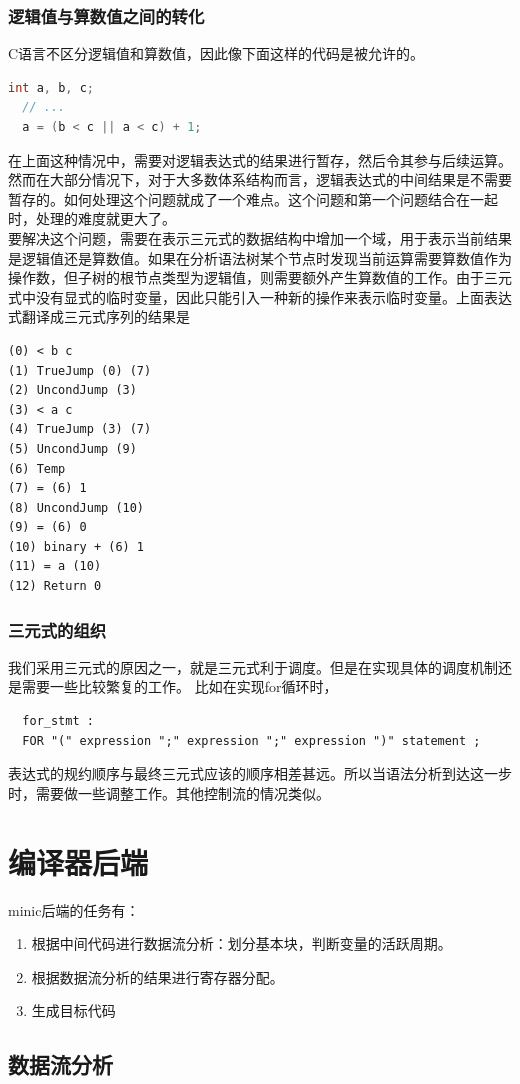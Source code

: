 \documentclass[12pt,a4paper,Flow]{report}
\begin{document}
\subsection{逻辑值与算数值之间的转化}
C语言不区分逻辑值和算数值，因此像下面这样的代码是被允许的。
\begin{lstlisting}[language=c]
  int a, b, c;
  // ...
  a = (b < c || a < c) + 1;
\end{lstlisting}
在上面这种情况中，需要对逻辑表达式的结果进行暂存，然后令其参与后续运算。然而在大部分情况下，对于大多数体系结构而言，逻辑表达式的中间结果是不需要暂存的。如何处理这个问题就成了一个难点。这个问题和第一个问题结合在一起时，处理的难度就更大了。\\
\indent 要解决这个问题，需要在表示三元式的数据结构中增加一个域，用于表示当前结果是逻辑值还是算数值。如果在分析语法树某个节点时发现当前运算需要算数值作为操作数，但子树的根节点类型为逻辑值，则需要额外产生算数值的工作。由于三元式中没有显式的临时变量，因此只能引入一种新的操作来表示临时变量。上面表达式翻译成三元式序列的结果是
\begin{verbatim}
(0) < b c 
(1) TrueJump (0) (7) 
(2) UncondJump (3) 
(3) < a c 
(4) TrueJump (3) (7) 
(5) UncondJump (9) 
(6) Temp 
(7) = (6) 1 
(8) UncondJump (10) 
(9) = (6) 0 
(10) binary + (6) 1 
(11) = a (10) 
(12) Return 0 
\end{verbatim}
\subsection{三元式的组织}
我们采用三元式的原因之一，就是三元式利于调度。但是在实现具体的调度机制还是需要一些比较繁复的工作。
比如在实现for循环时，
\begin{lstlisting}
  for_stmt :
  FOR "(" expression ";" expression ";" expression ")" statement ;
\end{lstlisting}
表达式的规约顺序与最终三元式应该的顺序相差甚远。所以当语法分析到达这一步时，需要做一些调整工作。其他控制流的情况类似。
\chapter{编译器后端}
minic后端的任务有：
\begin{enumerate}
\item 根据中间代码进行数据流分析：划分基本块，判断变量的活跃周期。
\item 根据数据流分析的结果进行寄存器分配。
\item 生成目标代码
\end{enumerate}
\newpage
\section{数据流分析}
\end{document}
